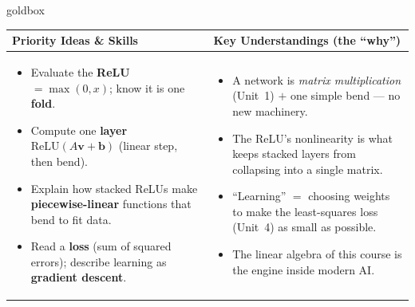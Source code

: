 \documentclass[10pt]{article}
\newcommand{\vv}{\mathbf{v}}
\newcommand{\bb}{\mathbf{b}}
\newcommand{\relu}{\mathrm{ReLU}}
\begin{document}
\renewcommand{\arraystretch}{1.4}
\begin{skillbox}{goldbox}
\begin{tabularx}{\linewidth}{@{}X|X@{}}
\textbf{Priority Ideas \& Skills} & \textbf{Key Understandings (the ``why'')} \\[2pt]
\hline
\vspace{-6pt}
\begin{itemize}[leftmargin=1.1em, nosep, after=\vspace{2pt}]
  \item Evaluate the \textbf{ReLU} $=\max(0,x)$; know it is one \textbf{fold}.
  \item Compute one \textbf{layer} $\relu(A\vv+\bb)$ (linear step, then bend).
  \item Explain how stacked ReLUs make \textbf{piecewise-linear} functions that bend to fit data.
  \item Read a \textbf{loss} (sum of squared errors); describe learning as \textbf{gradient descent}.
\end{itemize}
&
\vspace{-6pt}
\begin{itemize}[leftmargin=1.1em, nosep, after=\vspace{2pt}]
  \item A network is \emph{matrix multiplication} (Unit~1) $+$ one simple bend --- no new machinery.
  \item The ReLU's nonlinearity is what keeps stacked layers from collapsing into a single matrix.
  \item ``Learning'' $=$ choosing weights to make the least-squares loss (Unit~4) as small as possible.
  \item The linear algebra of this course is the engine inside modern AI.
\end{itemize}
\end{tabularx}
\end{skillbox}
\end{document}
